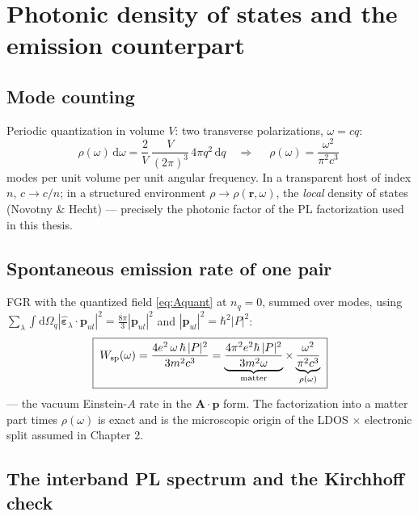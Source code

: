 \documentclass[11pt,a4paper]{article}
\numberwithin{equation}{section}
\newcommand{\pul}{\mathbf{p}_{ul}}
\newcommand{\eps}{\varepsilon}
\newcommand{\dd}{\mathrm{d}}
\begin{document}
\section{Photonic density of states and the emission counterpart}
\label{sec:photonic}

\subsection{Mode counting}

Periodic quantization in volume $V$: two transverse polarizations,
$\omega=cq$:
\begin{equation}
\rho(\omega)\,\dd\omega
=\frac{2}{V}\,\frac{V}{(2\pi)^3}\,4\pi q^2\,\dd q
\quad\Longrightarrow\quad
\boxed{\;\rho(\omega)=\frac{\omega^2}{\pi^2c^3}\;}
\label{eq:rhophot}
\end{equation}
modes per unit volume per unit angular frequency.  In a transparent
host of index $n$, $c\to c/n$; in a structured environment
$\rho\to\rho(\mathbf r,\omega)$, the \emph{local} density of states
(Novotny \& Hecht) --- precisely the photonic factor of the PL
factorization used in this thesis.

\subsection{Spontaneous emission rate of one pair}

FGR with the quantized field \eqref{eq:Aquant} at $n_q=0$, summed over
modes, using
$\sum_\lambda\int\dd\Omega_q|\hat{\bm\eps}_\lambda\!\cdot\!\pul|^2
=\tfrac{8\pi}{3}|\pul|^2$ and $|\pul|^2=\hbar^2|P|^2$:
\begin{equation}
\boxed{\;
W_{\rm sp}(\omega)
=\frac{4e^2\,\omega\,\hbar\,|P|^2}{3m^2c^3}
=\underbrace{\frac{4\pi^2e^2\hbar\,|P|^2}{3m^2\omega}}_{\text{matter}}
\times\underbrace{\frac{\omega^2}{\pi^2c^3}}_{\rho(\omega)}
\;}
\label{eq:Wsp}
\end{equation}
--- the vacuum Einstein-$A$ rate in the
$\mathbf A\!\cdot\!\mathbf p$ form.  The factorization into a matter
part times $\rho(\omega)$ is exact and is the microscopic origin of
the LDOS $\times$ electronic split assumed in Chapter 2.

\subsection{The interband PL spectrum and the Kirchhoff check}
\end{document}
